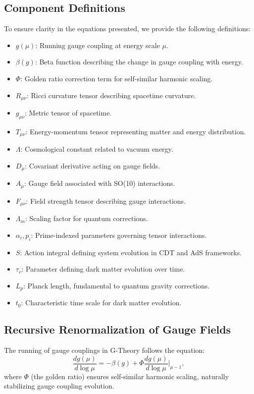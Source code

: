 \documentclass{article}
\theoremstyle{plain}
\begin{document}
\subsection{Component Definitions}
To ensure clarity in the equations presented, we provide the following definitions:

\begin{itemize}
    \item $g(\mu)$: Running gauge coupling at energy scale $\mu$.
    \item $\beta(g)$: Beta function describing the change in gauge coupling with energy.
    \item $\Phi$: Golden ratio correction term for self-similar harmonic scaling.
    \item $R_{\mu\nu}$: Ricci curvature tensor describing spacetime curvature.
    \item $g_{\mu\nu}$: Metric tensor of spacetime.
    \item $T_{\mu\nu}$: Energy-momentum tensor representing matter and energy distribution.
    \item $\Lambda$: Cosmological constant related to vacuum energy.
    \item $D_{\mu}$: Covariant derivative acting on gauge fields.
    \item $A_{\mu}$: Gauge field associated with SO(10) interactions.
    \item $F_{\mu\nu}$: Field strength tensor describing gauge interactions.
    \item $\Lambda_m$: Scaling factor for quantum corrections.
    \item $\alpha_i, p_i$: Prime-indexed parameters governing tensor interactions.
    \item $S$: Action integral defining system evolution in CDT and AdS frameworks.
    \item $\tau_v$: Parameter defining dark matter evolution over time.
    \item $L_p$: Planck length, fundamental to quantum gravity corrections.
    \item $t_0$: Characteristic time scale for dark matter evolution.
\end{itemize}
\subsection{Recursive Renormalization of Gauge Fields}
The running of gauge couplings in G-Theory follows the equation:
\begin{equation}
    \frac{d g(\mu)}{d \log \mu} = -\beta(g) + \Phi \frac{d g(\mu)}{d \log \mu} \bigg|_{\mu - 1},
\end{equation}
where $\Phi$ (the golden ratio) ensures self-similar harmonic scaling, naturally stabilizing gauge coupling evolution.
\end{document}
